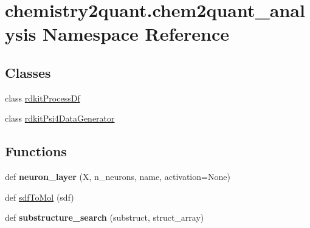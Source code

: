 \hypertarget{namespacechemistry2quant_1_1chem2quant__analysis}{}\section{chemistry2quant.\+chem2quant\+\_\+analysis Namespace Reference}
\label{namespacechemistry2quant_1_1chem2quant__analysis}
\subsection*{Classes}
\begin{DoxyCompactItemize}
\item 
class \hyperlink{classchemistry2quant_1_1chem2quant__analysis_1_1rdkitProcessDf}{rdkit\+Process\+Df}
\item 
class \hyperlink{classchemistry2quant_1_1chem2quant__analysis_1_1rdkitPsi4DataGenerator}{rdkit\+Psi4\+Data\+Generator}
\end{DoxyCompactItemize}
\subsection*{Functions}
\begin{DoxyCompactItemize}
\item 
\mbox{\label{namespacechemistry2quant_1_1chem2quant__analysis_af45b049d6a04c87f9f473f3356dda58c}} 
def {\bfseries neuron\+\_\+layer} (X, n\+\_\+neurons, name, activation=None)
\item 
def \hyperlink{namespacechemistry2quant_1_1chem2quant__analysis_a5c890927e4c20980765efaff0db0c04a}{sdf\+To\+Mol} (sdf)
\item 
\mbox{\label{namespacechemistry2quant_1_1chem2quant__analysis_a2707785b7dfd340c999a995b73c2b198}} 
def {\bfseries substructure\+\_\+search} (substruct, struct\+\_\+array)
\end{DoxyCompactItemize}
